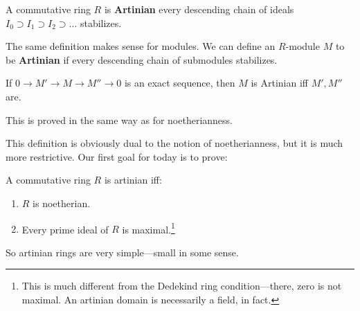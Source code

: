 \begin{definition} 
A commutative ring $R$ is \textbf{Artinian} every descending chain of ideals
$I_0 \supset I_1 \supset I_2 \supset \dots$
stabilizes.
\end{definition} 

\begin{definition}
The same definition makes sense for modules. We can define an $R$-module $M$ to
be \textbf{Artinian} if every descending chain of submodules stabilizes. 
\end{definition}

\begin{proposition}  \label{exactartinian}
If $0 \to M' \to M \to M'' \to 0$ is an exact sequence, then $M$ is Artinian
iff $M', M''$ are. 
\end{proposition}

This is proved in the same way as for noetherianness.


This definition is obviously dual to the notion of noetherianness, but it is
much more restrictive.  
Our first goal for today is to prove:

\begin{theorem} 
A commutative ring $R$ is artinian iff:
\begin{enumerate}
\item $R$ is noetherian. 
\item Every prime ideal of $R$ is maximal.\footnote{This is much different from
the Dedekind ring condition---there, zero is not maximal. An artinian domain is
necessarily a field, in fact.}
\end{enumerate}
\end{theorem} 


So artinian rings are very simple---small in some sense.


